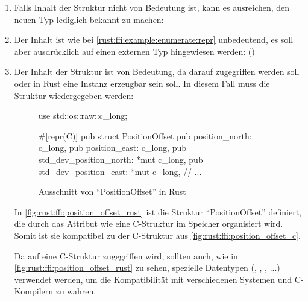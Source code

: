 \begin{enumerate}
	\item Falls Inhalt der Struktur nicht von Bedeutung ist, kann es ausreichen, den neuen Typ lediglich bekannt zu machen:  \label{rust:ffi:example:enumerate:repr}
	
	\item Der Inhalt ist wie bei \autoref{rust:ffi:example:enumerate:repr} unbedeutend, es soll aber ausdrücklich auf einen externen Typ hingewiesen werden:  \cite{rust:github:extern_type} ()
	
	\item Der Inhalt der Struktur ist von Bedeutung, da darauf zugegriffen werden soll oder in Rust eine Instanz erzeugbar sein soll. In diesem Fall muss die Struktur wiedergegeben werden:
	\begin{figure}[H]
		\begin{rustc}
			use std::os::raw::c_long;
			
			#[repr(C)]
			pub struct PositionOffset {
				pub position_north: c_long,
				pub position_east: c_long,
				pub std_dev_position_north: *mut c_long,
				pub std_dev_position_east: *mut c_long,
				// ...
			}
			
		\end{rustc}
		\caption{Ausschnitt von \enquote{PositionOffset}  in Rust}
		\label{fig:rust:ffi:position_offset_rust}
	\end{figure}
	
	In \autoref{fig:rust:ffi:position_offset_rust} ist die Struktur \enquote{PositionOffset} definiert,
	die durch das Attribut  wie eine C-Struktur im Speicher organisiert wird.
	Somit ist sie kompatibel zu der C-Struktur aus \autoref{fig:rust:ffi:position_offset_c}.
	
	Da auf eine C-Struktur zugegriffen wird, sollten auch, wie in \autoref{fig:rust:ffi:position_offset_rust} zu sehen, spezielle Datentypen (, , , ...) verwendet werden, um die Kompatibilität mit verschiedenen Systemen und C-Kompilern zu wahren. 
	
	

\end{enumerate}
